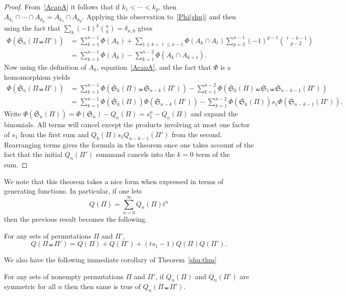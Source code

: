 \documentclass[ALCO,ThmDefs,Unicode,epreuves]{cedram}
\newcommand{\shu}{\shuffle}
\newcommand{\ofS}{\ol{\fS}}
\newcommand{\ol}{\overline}
\newcommand{\ree}[1]{\eqref{#1}}
\newcommand{\de}{\delta}
\newcommand{\fS}{{\mathfrak S}}
\begin{document}
\begin{proof}
From~\ree{AcapA} it follows that if $k_1 < \cdots < k_{p}$, then $A_{k_1} \cap \cdots \cap A_{k_p} = A_{k_1} \cap A_{k_{p}}$. Applying this observation to~\ree{Phi(shu)} and then using the fact that $\sum_k (-1)^k \binom{n}{k}=\de_{n,0}$ gives
\begin{align*}
\Phi(\ofS_n(\Pi \shuffle \Pi')) 
&= \sum_{k=1}^{n-1} \Phi(A_k) + \sum_{1 \leq k < \ell \leq n-1} \Phi(A_k \cap A_\ell) \sum_{p=2}^{n-1} (-1)^{p-1} \binom{\ell-k-1}{p-2}\\[10pt]
&= \sum_{k=1}^{n-1} \Phi(A_k) - \sum_{k=1}^{n-2} \Phi(A_k \cap A_{k+1}).
\end{align*}
Now using the definition of $A_k$, equation~\ree{AcapA}, and the fact that $\Phi$ is a homomorphism yields
\begin{align*}
\Phi(\ofS_n(\Pi \shuffle \Pi')) 
&= \sum_{k=1}^{n-1} \Phi(\ofS_k(\Pi) \shuffle \ofS_{n-k}(\Pi')) - \sum_{k=1}^{n-2} \Phi (\ofS_k(\Pi) \shuffle \fS_1 \shuffle \ofS_{n-k-1}(\Pi'))\\%
&= \sum_{k=1}^{n-1} \Phi(\ofS_k(\Pi)) \Phi(\ofS_{n-k}(\Pi')) - \sum_{k=1}^{n-2} \Phi (\ofS_k(\Pi))s_1\Phi(\ofS_{n-k-1}(\Pi')).
\end{align*}
Write $\Phi(\ofS_n(\Pi))= \Phi(\fS_n) - Q_n(\Pi) = s_1^n - Q_n(\Pi)$ and expand the binomials.
All terms will cancel except the products %
involving at most one factor of $s_1$ from the first sum and 
$Q_k(\Pi)s_1Q_{n-k-1}(\Pi')$ from the second. Rearranging terms gives the formula in the theorem once one takes account of the fact that the initial $Q_n(\Pi')$ summand cancels into the $k=0$ term of the sum.
\end{proof}

We note that this theorem takes a nice form when expressed in terms of generating functions. In particular, if one lets
\[
Q(\Pi) = \sum_{n=0}^{\infty} Q_n(\Pi)t^n
\]
then the previous result becomes the following.
\begin{coro}
For any sets of permutations $\Pi$ and $\Pi'$,
\[
Q(\Pi \shuffle \Pi') = Q(\Pi) + Q(\Pi') + (ts_1 - 1)Q(\Pi)Q(\Pi').
\]
\end{coro}

We also have the following immediate corollary of Theorem~\ref{shu:thm}
\begin{coro}
For any sets of nonempty permutations $\Pi$ and $\Pi'$, if $Q_n(\Pi)$ and $Q_n(\Pi')$ are symmetric for all $n$ then then same is true of $Q_n(\Pi\shu\Pi')$.%
\end{coro}
\end{document}
